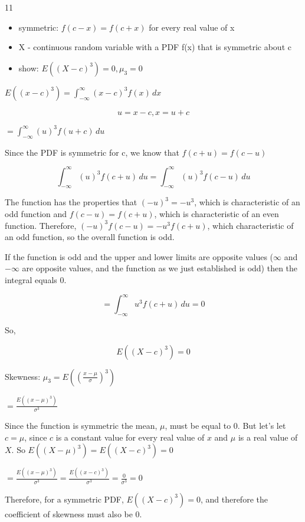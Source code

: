 \documentclass[12 pt]{article}
\begin{document}
    \begin{exercise}{11}
    \hfill

    \begin{itemize}
        \item symmetric: $f(c-x) = f(c+x)$ for every real value of x
        \item X - continuous random variable with a PDF f(x) that is symmetric about c
        \item show: $E((X-c)^3) = 0, {\mu}_3 = 0$
    \end{itemize}

    $E((x-c)^3) = \int_{- \infty}^{\infty} (x-c)^3 f(x) \, dx$

    $$u = x-c, x = u+c$$

    $= \int_{- \infty}^{\infty} (u)^3 f(u+c) \, du$

    Since the PDF is symmetric for c, we know that $f(c+u)=f(c-u)$

    $$\int_{- \infty}^{\infty} (u)^3 f(c+u) \, du = \int_{- \infty}^{\infty} (u)^3 f(c-u) \, du$$

    The function has the properties that $(-u)^3 = -u^3$, which is characteristic of an odd function and $f(c-u) = f(c+u)$, which is characteristic of an even function. Therefore, $(-u)^3 f(c-u) = -u^3 f(c+u)$, which characteristic of an odd function, so the overall function is odd.

    If the function is odd and the upper and lower limits are opposite values ($\infty$ and $- \infty$ are opposite values, and the function as we just established is odd) then the integral equals 0.

    $$= \int_{- \infty}^{\infty} u^3 f(c+u) \, du = 0$$

    So,

    $$E((X-c)^3) = 0$$

    Skewness: ${\mu}_3 = E((\frac{x - \mu}{\sigma})^3)$

    $= \frac{E((x-\mu)^3)}{\sigma^3}$

    Since the function is symmetric the mean, $\mu$, must be equal to 0. But let's let $c=\mu$, since $c$ is a constant value for every real value of $x$ and $\mu$ is a real value of $X$. So $E((X - \mu)^3) = E((X - c)^3) = 0$

    $= \frac{E((x - \mu)^3)}{{\sigma}^3} = \frac{E((x-c)^3)}{{\sigma}^3} = \frac{0}{{\sigma}^3} = 0$

    Therefore, for a symmetric PDF, $E((X-c)^3) = 0$, and therefore the coefficient of skewness must also be 0.

    \hfill   
    \end{exercise}
\end{document}

